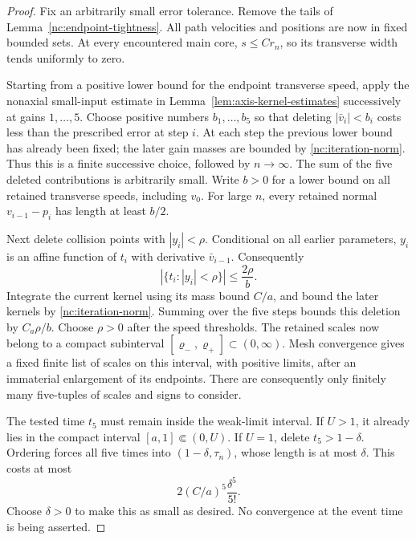 \begin{proof}
Fix an arbitrarily small error tolerance.  Remove the tails of
Lemma~\ref{nc:endpoint-tightness}.  All path velocities and
positions are now in fixed bounded sets.  At every encountered
main core, \(s\le Cr_n\), so its transverse width tends uniformly
to zero.

Starting from a positive lower bound for the endpoint transverse
speed, apply the nonaxial small-input estimate in
Lemma~\ref{lem:axis-kernel-estimates} successively at gains
\(1,\ldots,5\).  Choose positive numbers \(b_1,\ldots,b_5\)
so that deleting \(|\bar v_i|<b_i\) costs less than the prescribed
error at step \(i\).  At each step the previous lower bound has
already been fixed; the later gain masses are bounded by
\eqref{nc:iteration-norm}.  Thus this is a finite successive
choice, followed by \(n\to\infty\).  The sum of the five deleted
contributions is arbitrarily small.  Write \(b>0\) for a lower
bound on all retained transverse speeds, including \(v_0\).
For large \(n\), every retained normal \(v_{i-1}-p_i\) has length
at least \(b/2\).

Next delete collision points with \(|y_i|<\rho\).
Conditional on all earlier parameters, \(y_i\) is an affine
function of \(t_i\) with derivative \(\bar v_{i-1}\).
Consequently
\[
 \left|\{t_i:|y_i|<\rho\}\right|\le\frac{2\rho}{b}.
\]
Integrate the current kernel using its mass bound \(C/a\),
and bound the later kernels by \eqref{nc:iteration-norm}.
Summing over the five steps bounds this deletion by \(C_a\rho/b\).
Choose \(\rho>0\) after the speed thresholds.  The retained
scales now belong to a compact subinterval
\([\varrho_-,\varrho_+]\subset(0,\infty)\).
Mesh convergence gives a fixed finite list of scales on this
interval, with positive limits, after an immaterial enlargement
of its endpoints.  There are consequently only finitely many
five-tuples of scales and signs to consider.

The tested time \(t_5\) must remain inside the weak-limit
interval.  If \(U>1\), it already lies in the compact interval
\([a,1]\Subset(0,U)\).  If \(U=1\), delete \(t_5>1-\delta\).
Ordering forces all five times into \((1-\delta,\tau_n)\),
whose length is at most \(\delta\).  This costs at most
\begin{equation}
\label{nc:upper-endpoint-cost}
 2(C/a)^5\frac{\delta^5}{5!}.
\end{equation}
Choose \(\delta>0\) to make this as small as desired.  No
convergence at the event time is being asserted.


\end{proof}
